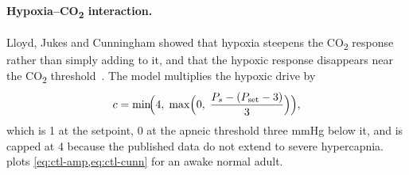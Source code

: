 \paragraph{Hypoxia--CO\textsubscript{2} interaction.} Lloyd, Jukes and Cunningham showed that hypoxia steepens the CO\textsubscript{2} response rather than simply adding to it, and that the hypoxic response disappears near the CO\textsubscript{2} threshold~\citep{lloyd1958}. The model multiplies the hypoxic drive by
\begin{equation}
c = \min\!\Bigl(4,\;\max\Bigl(0,\;\frac{P_s - (P_{\mathrm{set}} - 3)}{3}\Bigr)\Bigr),
\label{eq:ctl-cunn}
\end{equation}
which is 1 at the setpoint, 0 at the apneic threshold three mmHg below it, and is capped at 4 because the published data do not extend to severe hypercapnia.  plots \cref{eq:ctl-amp,eq:ctl-cunn} for an awake normal adult.

